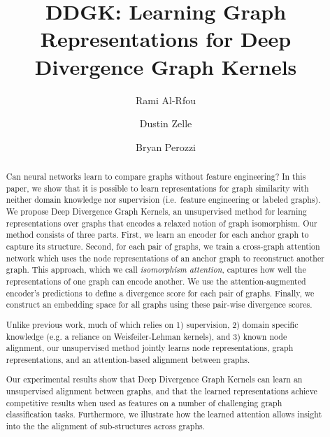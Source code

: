 \documentclass[sigconf]{acmart}
\begin{document}
\title{DDGK: Learning Graph Representations for Deep Divergence Graph Kernels}



\author{Rami Al-Rfou}

\author{Dustin Zelle}

\author{Bryan Perozzi}


\renewcommand{\shortauthors}{R. Al-Rfou et al.}


\begin{abstract}

Can neural networks learn to compare graphs without feature engineering?
In this paper, we show that it is possible to learn representations for graph similarity with neither domain knowledge nor supervision (i.e.\ feature engineering or labeled graphs).
We propose Deep Divergence Graph Kernels, an unsupervised method for learning representations over graphs that encodes a relaxed notion of graph isomorphism. 
Our method consists of three parts.  
First, we learn an encoder for each anchor graph to capture its structure.
Second, for each pair of graphs, we train a cross-graph attention network which uses the node representations of an anchor graph to reconstruct another graph.
This approach, which we call \emph{isomorphism attention}, captures how well the representations of one graph can encode another.
We use the attention-augmented encoder's predictions to define a divergence score for each pair of graphs.
Finally, we construct an embedding space for all graphs using these pair-wise divergence scores. 

Unlike previous work, much of which relies on 1) supervision, 2) domain specific knowledge (e.g. a reliance on Weisfeiler-Lehman kernels), and 3) known node alignment, our unsupervised method jointly learns node representations, graph representations, and an attention-based alignment between graphs.

Our experimental results show that Deep Divergence Graph Kernels can learn an unsupervised alignment between graphs, and that the learned representations achieve competitive results when used as features on a number of challenging graph classification tasks.
Furthermore, we illustrate how the learned attention allows insight into the the alignment of sub-structures across graphs.
\end{abstract}
\end{document}
